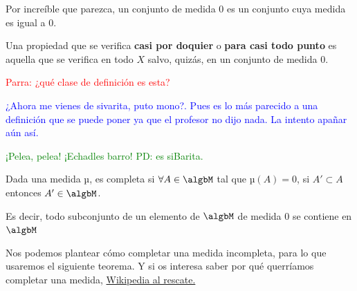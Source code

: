 \documentclass{apuntes}
\begin{document}
\begin{defn}
Por increíble que parezca, un conjunto de medida 0 es un conjunto cuya medida es igual a 0.
\end{defn}

\begin{defn}
Una propiedad que se verifica  \textbf{casi por doquier} o \textbf{para casi todo punto} es aquella que se verifica en todo $X$ salvo, quizás, en un conjunto de medida 0.
\end{defn}
\textcolor{red}{Parra: ¿qué clase de definición es esta?}

\textcolor{blue}{¿Ahora me vienes de sivarita, puto mono?. Pues es lo más parecido a una definición que se puede poner ya que el profesor no dijo nada. La intento apañar aún así.}

\textcolor{green}{¡Pelea, pelea! ¡Echadles barro! PD: es siBarita.}

\begin{defn}
Dada una medida µ, es completa si $\forall A \in \algbM$ tal que $µ(A)=0$, si $A'\subset A$ entonces $A' \in \algbM$.

Es decir, todo subconjunto de un elemento de $\algbM$ de medida 0 se contiene en $\algbM$
\end{defn}

Nos podemos plantear cómo completar una medida incompleta, para lo que usaremos el siguiente teorema. Y si os interesa saber por qué querríamos completar una medida, \href{http://en.wikipedia.org/wiki/Complete_measure#Motivation}{Wikipedia al rescate.}
\end{document}
